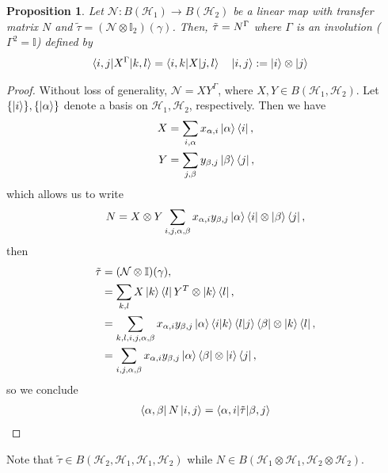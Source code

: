 \documentclass[10pt,oneside,longbibliography]{report}
\newtheorem{proposition}{Proposition}[section]
\begin{document}
\begin{proposition}
Let $\mathcal{N}: B(\mathcal{H}_1) \rightarrow B(\mathcal{H}_2)$ be a linear map with transfer matrix $N$ and $\tilde{\tau} = (\mathcal{N}\otimes \mathbb{I}_2)(\gamma)$. Then, $\Tilde{\tau}=N^{\Gamma}$ where $\Gamma$ is an involution ($\Gamma^2 = \mathbb{I}$) defined by 
\begin{align}
    \braket{i,j|X^{\Gamma}|k,l}&=\braket{i,k|X|j,l} \quad \ket{i,j}:= \ket{i}\otimes \ket{j}
\end{align}
\end{proposition}

\begin{tcolorbox}[colframe=black,breakable, colback=black!5, arc=0pt, outer arc=0pt,boxrule=0.5pt]
\begin{proof}
Without loss of generality, $\mathcal{N}=XY^{\Gamma}$, where $X,Y \in B(\mathcal{H}_1,\mathcal{H}_2)$. Let $\{\ket{i}\}, \{\ket{\alpha}\}$ denote a basis on $\mathcal{H}_1,\mathcal{H}_2$, respectively. Then we have 
\begin{align}
    X&=\sum_{i,\alpha} x_{\alpha,i} \ket{\alpha}\bra{i},\\
    Y&= \sum_{j,\beta} y_{\beta,j} \ket{\beta}\bra{j},
\end{align}
which allows us to write
\begin{align}
    N=X\otimes Y \sum_{i,j,\alpha,\beta} x_{\alpha,i} y_{\beta,j} \ket{\alpha}\bra{i} \otimes \ket{\beta}\bra{j},
\end{align}
then 
\begin{align}
    \tilde{\tau} &= (\mathcal{N}\otimes \mathbb{I})(\gamma),\\
    &= \sum_{k,l} X \ket{k}\bra{l} Y^T \otimes \ket{k}\bra{l}, \\
    &=\sum_{k,l,i,j,\alpha,\beta} x_{\alpha, i} y_{\beta,j} \ket{\alpha}\braket{i|k}\braket{l|j}\bra{\beta}\otimes \ket{k}\bra{l}, \\
    &= \sum_{i,j,\alpha,\beta} x_{\alpha,i} y_{\beta,j} \ket{\alpha}\bra{\beta} \otimes \ket{i}\bra{j},
\end{align}
so we conclude
\begin{align}
    \bra{\alpha,\beta}N\ket{i,j} = \braket{\alpha,i|\tilde{\tau}|\beta,j}
\end{align}
\end{proof}
Note that $\tilde{\tau}\in B(\mathcal{H}_2,\mathcal{H}_1,\mathcal{H}_1,\mathcal{H}_2)$ while $N\in B(\mathcal{H}_1\otimes \mathcal{H}_1, \mathcal{H}_2 \otimes \mathcal{H}_2)$.
\end{tcolorbox}


{}

\end{document}

